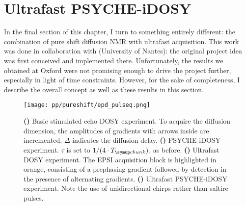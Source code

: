 \section{Ultrafast PSYCHE-iDOSY}
\label{sec:pureshift__epsidosy}

In the final section of this chapter, I turn to something entirely different: the combination of pure shift diffusion NMR with ultrafast acquisition.
This work was done in collaboration with \JND{} (University of Nantes): the original project idea was first conceived and implemented there.
Unfortunately, the results we obtained at Oxford were not promising enough to drive the project further, especially in light of time constraints.
However, for the sake of completeness, I describe the overall concept as well as these results in this section.

\begin{figure}[htb]
    \centering
    \texttt{[image: pp/pureshift/epd\_pulseq.png]}%
    {\label{fig:epd_pulseq_stedosy}}%
    {\label{fig:epd_pulseq_psychedosy}}%
    {\label{fig:epd_pulseq_epsidosy}}%
    {\label{fig:epd_pulseq_epsipsychedosy}}%
    \caption[EPSI PSYCHE-iDOSY and associated pulse sequences]{
        \textbf{()} Basic stimulated echo DOSY experiment.
        To acquire the diffusion dimension, the amplitudes of gradients with arrows inside are incremented.
        $\Delta$ indicates the diffusion delay.
        \textbf{()} PSYCHE-iDOSY experiment. $\tau$ is set to $1/(4 \cdot \Tchunk)$, as before.
        \textbf{()} Ultrafast DOSY experiment. The EPSI acquisition block is highlighted in orange, consisting of a prephasing gradient followed by detection in the presence of alternating gradients.
        \textbf{()} Ultrafast PSYCHE-iDOSY experiment. Note the use of unidirectional chirps rather than saltire pulses.
    }
    \label{fig:epd_pulseq}
\end{figure}

